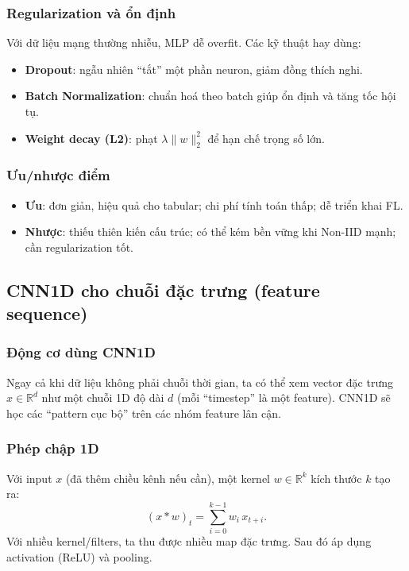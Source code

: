 \documentclass[12pt,a4paper]{article}
\begin{document}
\subsubsection{Regularization và ổn định}
Với dữ liệu mạng thường nhiễu, MLP dễ overfit. Các kỹ thuật hay dùng:
\begin{itemize}
    \item \textbf{Dropout}: ngẫu nhiên ``tắt'' một phần neuron, giảm đồng thích nghi.
    \item \textbf{Batch Normalization}: chuẩn hoá theo batch giúp ổn định và tăng tốc hội tụ.
    \item \textbf{Weight decay (L2)}: phạt $\lambda\|w\|_2^2$ để hạn chế trọng số lớn.
\end{itemize}

\subsubsection{Ưu/nhược điểm}
\begin{itemize}
    \item \textbf{Ưu}: đơn giản, hiệu quả cho tabular; chi phí tính toán thấp; dễ triển khai FL.
    \item \textbf{Nhược}: thiếu thiên kiến cấu trúc; có thể kém bền vững khi Non-IID mạnh; cần regularization tốt.
\end{itemize}

\subsection{CNN1D cho chuỗi đặc trưng (feature sequence)}

\subsubsection{Động cơ dùng CNN1D}
Ngay cả khi dữ liệu không phải chuỗi thời gian, ta có thể xem vector đặc trưng $x\in\mathbb{R}^d$ như một chuỗi 1D độ dài $d$ (mỗi ``timestep'' là một feature). CNN1D sẽ học các ``pattern cục bộ'' trên các nhóm feature lân cận.

\subsubsection{Phép chập 1D}
Với input $x$ (đã thêm chiều kênh nếu cần), một kernel $w\in\mathbb{R}^{k}$ kích thước $k$ tạo ra:
\[
(x * w)_t = \sum_{i=0}^{k-1} w_i\,x_{t+i}.
\]
Với nhiều kernel/filters, ta thu được nhiều map đặc trưng. Sau đó áp dụng activation (ReLU) và pooling.
\end{document}

